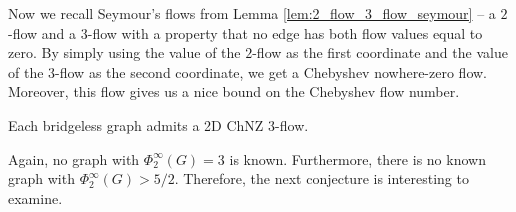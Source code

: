 
Now we recall Seymour's flows from Lemma \ref{lem:2_flow_3_flow_seymour} – a $2$-flow and a $3$-flow with a property that no edge has both flow values equal to zero. By simply using the value of the $2$-flow as the first coordinate and the value of the $3$-flow as the second coordinate, we get a Chebyshev nowhere-zero flow. Moreover, this flow gives us a nice bound on the Chebyshev flow number.

\begin{proposition} \emph{\cite[p. 8]{preprint}}
Each bridgeless graph admits a 2D ChNZ $3$-flow.\label{prop:chebyshev_upper_seymour}
\end{proposition}

Again, no graph with $\Phi_2^\infty(G)=3$ is known. Furthermore, there is no known graph with $\Phi_2^\infty(G)>5/2$. Therefore, the next conjecture is interesting to examine.

